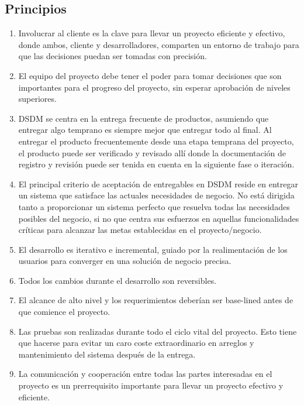 \documentclass{article}
\begin{document}
	\subsection{Principios}
	\begin{enumerate}
		\item Involucrar al cliente es la clave para llevar un proyecto eficiente y efectivo, donde ambos, cliente y desarrolladores, comparten un entorno de trabajo para que las decisiones puedan ser tomadas con precisión.
		\item El equipo del proyecto debe tener el poder para tomar decisiones que son importantes para el progreso del proyecto, sin esperar aprobación de niveles superiores.
		\item DSDM se centra en la entrega frecuente de productos, asumiendo que entregar algo temprano es siempre mejor que entregar todo al final. Al entregar el producto frecuentemente desde una etapa temprana del proyecto, el producto puede ser verificado y revisado allí donde la documentación de registro y revisión puede ser tenida en cuenta en la siguiente fase o iteración.
		\item El principal criterio de aceptación de entregables en DSDM reside en entregar un sistema que satisface las actuales necesidades de negocio. No está dirigida tanto a proporcionar un sistema perfecto que resuelva todas las necesidades posibles del negocio, si no que centra sus esfuerzos en aquellas funcionalidades críticas para alcanzar las metas establecidas en el proyecto/negocio.
		\item El desarrollo es iterativo e incremental, guiado por la realimentación de los usuarios para converger en una solución de negocio precisa.
		\item Todos los cambios durante el desarrollo son reversibles.
		\item El alcance de alto nivel y los requerimientos deberían ser base-lined antes de que comience el proyecto.
		\item Las pruebas son realizadas durante todo el ciclo vital del proyecto. Esto tiene que hacerse para evitar un caro coste extraordinario en arreglos y mantenimiento del sistema después de la entrega.
		\item La comunicación y cooperación entre todas las partes interesadas en el proyecto es un prerrequisito importante para llevar un proyecto efectivo y eficiente.
	\end{enumerate}
\end{document}

